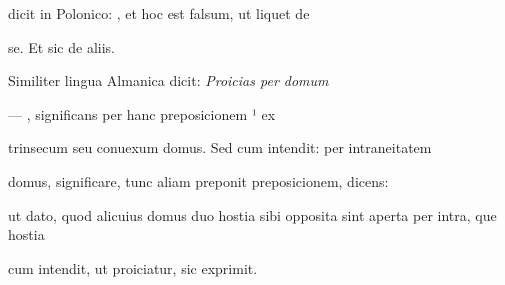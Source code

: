 dicit in Polonico:   , et hoc est falsum, ut liquet de

\splitlines{}

se. Et sic de aliis.

\indentK Similiter lingua Almanica dicit: \textit{Proicias per domum}

\fulllines{}

— , significans per hanc preposicionem ¹ ex

trinsecum seu conuexum domus. Sed cum intendit: per intraneitatem

domus, significare, tunc aliam preponit preposicionem, dicens: 




\fullpreviouslines
{
\color{blue}


ut dato, quod alicuius domus duo hostia sibi opposita sint aperta per intra, que hostia%

cum intendit, ut proiciatur, sic exprimit.

}



